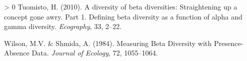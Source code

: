 \documentclass[10pt,oneside]{article}
\newlength{\cslhangindent}
\newenvironment{CSLReferences}[3] %
 {%
  \setlength{\parindent}{0pt}
  \ifodd #1 \everypar{\setlength{\hangindent}{\cslhangindent}}\ignorespaces\fi
  \ifnum #2 > 0
  \setlength{\parskip}{#2\baselineskip}
  \fi
 }%
 {}
\begin{document}
\begin{CSLReferences}{1}{0}
\leavevmode\hypertarget{ref-Tuomisto2010DivBet}{}%
Tuomisto, H. (2010). A diversity of beta diversities: Straightening up a
concept gone awry. Part 1. Defining beta diversity as a function of
alpha and gamma diversity. \emph{Ecography}, 33, 2--22.

\leavevmode\hypertarget{ref-Wilson1984MeaBet}{}%
Wilson, M.V. \& Shmida, A. (1984). Measuring Beta Diversity with
Presence-Absence Data. \emph{Journal of Ecology}, 72, 1055--1064.

\end{CSLReferences}
\end{document}
